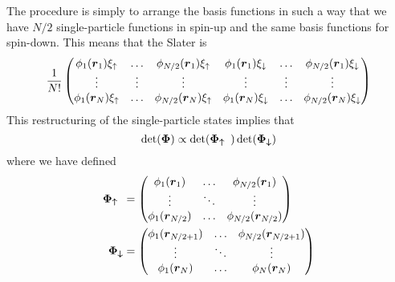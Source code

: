         The procedure is simply to arrange the basis functions in such a way
        that we have $N/2$ single-particle functions in spin-up and the same
        basis functions for spin-down. This means that the Slater is
            \begin{equation}
                \frac{1}{N!} \begin{pmatrix}
                    \phi_1(\boldsymbol{{r}}_1)\xi_{\uparrow} & \dots &
                    \phi_{N/2}(\boldsymbol{{r}}_1)\xi_{\uparrow} &
                    \phi_1(\boldsymbol{{r}}_1)\xi_{\downarrow} & \dots &
                    \phi_{N/2}(\boldsymbol{{r}}_1)\xi_{\downarrow} \\
                    \vdots & \vdots & \vdots & \vdots & \vdots & \vdots \\
                    \phi_1(\boldsymbol{{r}}_N)\xi_{\uparrow} & \dots &
                    \phi_{N/2}(\boldsymbol{{r}}_N)\xi_{\uparrow} &
                    \phi_1(\boldsymbol{{r}}_N)\xi_{\downarrow} & \dots &
                    \phi_{N/2}(\boldsymbol{{r}}_N)\xi_{\downarrow} \\
                \end{pmatrix}
            \end{equation}
        This restructuring of the single-particle states implies that
            \begin{equation}
                \det(\boldsymbol{{\Phi}}) \propto \det(\boldsymbol{{\Phi_{\uparrow}}})
                \det(\boldsymbol{{\Phi_{\downarrow}}})
            \end{equation}
        where we have defined
            \begin{equation}
                \begin{aligned}
                    \boldsymbol{{\Phi_{\uparrow}}} &= \begin{pmatrix}
                        \phi_1(\boldsymbol{{r}}_1) & \dots & \phi_{N/2}(\boldsymbol{{r}}_1) \\
                        \vdots & \ddots & \vdots \\
                        \phi_1(\boldsymbol{{r}}_{N/2}) & \dots &
                        \phi_{N/2}(\boldsymbol{{r}}_{N/2})
                    \end{pmatrix} \\
                    \boldsymbol{{\Phi_{\downarrow}}} &= \begin{pmatrix}
                        \phi_1(\boldsymbol{{r}}_{N/2+1}) & \dots &
                        \phi_{N/2}(\boldsymbol{{r}}_{N/2+1}) \\
                        \vdots & \ddots & \vdots \\
                        \phi_1(\boldsymbol{{r}}_{N}) & \dots & \phi_{N}(\boldsymbol{{r}}_{N})
                    \end{pmatrix}
                \end{aligned}
            \end{equation}
